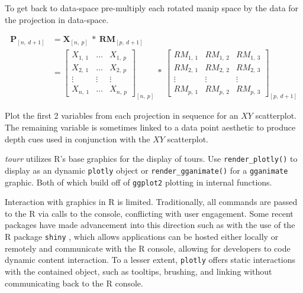 \documentclass{monashthesis}
\begin{document}
To get back to data-space pre-multiply each rotated manip space by the
data for the projection in data-space.

\begin{align}
  \textbf{P}_{[n,~d+1]}
    &= \textbf{X}_{[n,~p]} ~*~ \textbf{RM}_{[p,~d+1]} \\
    &=
      \begin{bmatrix}
          X_{1,~1} & \dots & X_{1,~p} \\
          X_{2,~1} & \dots & X_{2,~p} \\
          \vdots   & \vdots & \vdots  \\
          X_{n,~1} & \dots & X_{n,~p}
      \end{bmatrix}_{[n,~p]}
      ~*~
      \begin{bmatrix}
        RM_{1,~1} & RM_{1,~2} & RM_{1,~3} \\
        RM_{2,~1} & RM_{2,~2} & RM_{2,~3} \\
        \vdots     & \vdots     & \vdots     \\
        RM_{p,~1} & RM_{p,~2} & RM_{p,~3}
      \end{bmatrix}_{[p,~d+1]}
\end{align}

Plot the first 2 variables from each projection in sequence for an
\(XY\) scatterplot. The remaining variable is sometimes linked to a data
point aesthetic to produce depth cues used in conjunction with the
\(XY\) scatterplot.

\emph{tourr} utilizes R's base graphics for the display of tours. Use
\texttt{render\_plotly()} to display as an dynamic \texttt{plotly}
\textcite{sievert_plotly_2018} object or \texttt{render\_gganimate()}
for a \texttt{gganimate} \textcite{pedersen_gganimate:_2019} graphic.
Both of which build off of \texttt{ggplot2} plotting in internal
functions.

Interaction with graphics in R is limited. Traditionally, all commands
are passed to the R via calls to the console, conflicting with user
engagement. Some recent packages have made advancement into this
direction such as with the use of the R package \texttt{shiny}
\autocite{chang_shiny:_2018}, which allows applications can be hosted
either locally or remotely and communicate with the R console, allowing
for developers to code dynamic content interaction. To a lesser extent,
\texttt{plotly} offers static interactions with the contained object,
such as tooltips, brushing, and linking without communicating back to
the R console.
\end{document}
